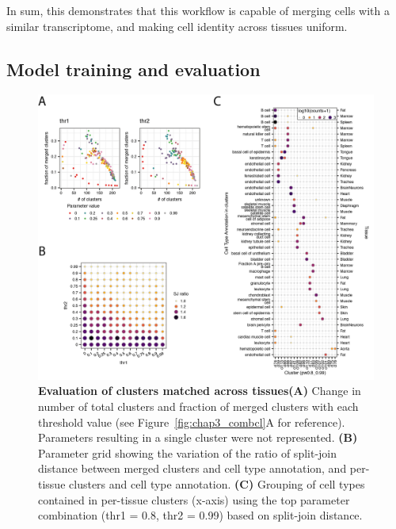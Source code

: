 In sum, this demonstrates that this workflow is capable of merging cells with a similar transcriptome, and making cell identity across tissues uniform.


\subsection{Model training and evaluation}
\label{section3.2.3}

\begin{figure}[ht!] %
    \centering    
    \includegraphics[width=1.0\textwidth]{Chapter3/Figs/chap3_combineData.png} %
    \caption[Evaluation of clusters matched across tissues]{\textbf{Evaluation of clusters matched across tissues}\newline\textbf{(A)} Change in number of total clusters and fraction of merged clusters with each threshold value (see Figure~\ref{fig:chap3_combcl}A for reference). Parameters resulting in a single cluster were not represented. \textbf{(B)} Parameter grid showing the variation of the ratio of split-join distance between merged clusters and cell type annotation, and per-tissue clusters and cell type annotation. \textbf{(C)} Grouping of cell types contained in per-tissue clusters (x-axis) using the top parameter combination (thr1 = 0.8, thr2 = 0.99) based on split-join distance.}
    \label{fig:chap3_combdat}
\end{figure}

